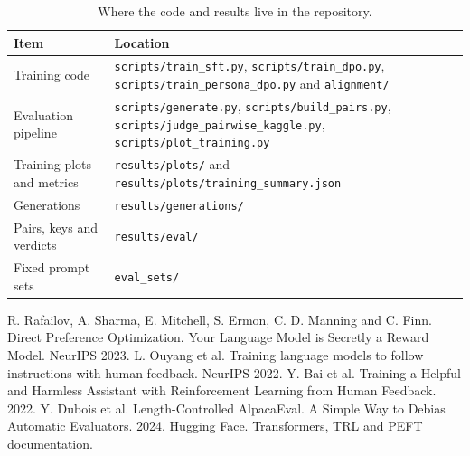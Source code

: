 \documentclass[11pt]{article}
\newcommand{\brk}{\allowbreak}
\begin{document}
\begin{table}[htbp]
\centering\small
\begin{tabularx}{\textwidth}{l Y}
\toprule
Item & Location \\
\midrule
Training code & \texttt{scripts/\brk train\_sft.py}, \texttt{scripts/\brk train\_dpo.py}, \texttt{scripts/\brk train\_persona\_dpo.py} and \texttt{alignment/} \\
Evaluation pipeline & \texttt{scripts/\brk generate.py}, \texttt{scripts/\brk build\_pairs.py}, \texttt{scripts/\brk judge\_pairwise\_kaggle.py}, \texttt{scripts/\brk plot\_training.py} \\
Training plots and metrics & \texttt{results/\brk plots/} and \texttt{results/\brk plots/\brk training\_summary.json} \\
Generations & \texttt{results/\brk generations/} \\
Pairs, keys and verdicts & \texttt{results/\brk eval/} \\
Fixed prompt sets & \texttt{eval\_sets/} \\
\bottomrule
\end{tabularx}
\caption{Where the code and results live in the repository.}
\label{tab:repro}
\end{table}

\begin{thebibliography}{9}\small
{} R. Rafailov, A. Sharma, E. Mitchell, S. Ermon, C. D. Manning and C. Finn. Direct Preference Optimization. Your Language Model is Secretly a Reward Model. NeurIPS 2023.
 L. Ouyang et al. Training language models to follow instructions with human feedback. NeurIPS 2022.
 Y. Bai et al. Training a Helpful and Harmless Assistant with Reinforcement Learning from Human Feedback. 2022.
 Y. Dubois et al. Length-Controlled AlpacaEval. A Simple Way to Debias Automatic Evaluators. 2024.
 Hugging Face. Transformers, TRL and PEFT documentation.
\end{thebibliography}
\end{document}
